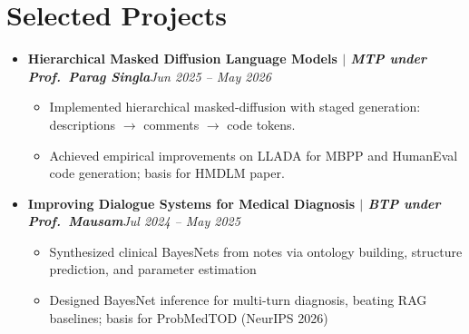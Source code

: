 \documentclass[10pt,letterpaper]{article}
\newcommand{\dates}[1]{\hfill{\color{dateblue}\itshape #1}}
\newcommand{\proj}[3]{\textbf{#1 $|$ \textit{#2}}\dates{#3}}
\begin{document}
\section{Selected Projects}
\begin{itemize}
  \item \proj{Hierarchical Masked Diffusion Language Models}{MTP under Prof.\ Parag Singla}{Jun 2025 -- May 2026}
  \begin{itemize}
    \item Implemented hierarchical masked-diffusion with staged generation: descriptions $\rightarrow$ comments $\rightarrow$ code tokens.
    \item Achieved empirical improvements on LLADA for MBPP and HumanEval code generation; basis for HMDLM paper.
  \end{itemize}
  \item \proj{Improving Dialogue Systems for Medical Diagnosis}{BTP under Prof.\ Mausam}{Jul 2024 -- May 2025}
  \begin{itemize}
    \item Synthesized clinical BayesNets from notes via ontology building, structure prediction, and parameter estimation
    \item Designed BayesNet inference for multi-turn diagnosis, beating RAG baselines; basis for ProbMedTOD (NeurIPS 2026)
  \end{itemize}
\end{itemize}
\end{document}
